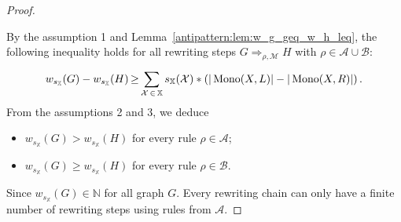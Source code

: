 
\begin{proof} 
    \label{antipattern:proof:thm:termination_grs}
    
    By the assumption 1 and Lemma~\ref{antipattern:lem:w_g_geq_w_h_leq}, the following inequality holds for all rewriting steps $G \mathop{\Rightarrow}_{\rho, \mathcal{M}} H$  with $\rho \mathop{\in} \mathcal{A} \mathop{\cup} \mathcal{B}$:
      \[
        w_{s_\mathbb{X}}(G) - w_{s_\mathbb{X}}(H) 
        \mathop{\geq} 
        \sum_{\mathcal{X} \mathop{\in} \mathbb{X}}^{}s_\mathbb{X}(\mathcal{X}) * \left( 
            |\operatorname{Mono}(X,L)| -
            |\operatorname{Mono}(X,R)|
            \right).
    \]
    \noindent From the assumptions 2 and 3, we deduce 
    \begin{itemize}
        \item \( w_{s_\mathbb{X}}(G) \mathop{>} w_{s_\mathbb{X}}(H) \) for every rule \(\rho \mathop{\in} \mathcal{A}\);
        \item  \( w_{s_\mathbb{X}}(G) \mathop{\geq} w_{s_\mathbb{X}}(H) \) for every rule \(\rho \mathop{\in} \mathcal{B}\).
    \end{itemize}
    Since $w_{s_\mathbb{X}}(G) \mathop{\in} \mathbb{N}$ for all graph $G$. Every rewriting chain can only have a finite number of rewriting steps using rules from $\mathcal{A}$.
\end{proof} 